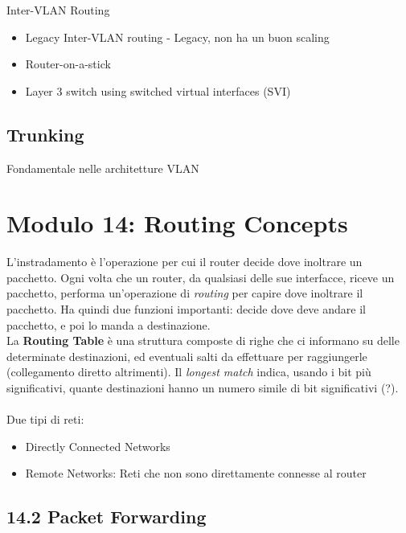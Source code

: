 \documentclass[12pt, a4paper]{article}
\begin{document}
	Inter-VLAN Routing
	\begin{itemize}
		\item Legacy Inter-VLAN routing - Legacy, non ha un buon scaling
		\item Router-on-a-stick 
		\item Layer 3 switch using switched virtual interfaces (SVI)
	\end{itemize}	
	
	\subsection*{Trunking}
	Fondamentale nelle architetture VLAN
	
	
	
	\section*{Modulo 14: Routing Concepts}
	
	L'instradamento è l'operazione per cui il router decide dove inoltrare un pacchetto. Ogni volta che un router, da qualsiasi delle sue interfacce, riceve un pacchetto, performa un'operazione di \textit{routing} per capire dove inoltrare il pacchetto. Ha quindi due funzioni importanti: decide dove deve andare il pacchetto, e poi lo manda a destinazione. \\
	La \textbf{Routing Table} è una struttura composte di righe che ci informano su delle determinate destinazioni, ed eventuali salti da effettuare per raggiungerle (collegamento diretto altrimenti). Il \textit{longest match} indica, usando i bit più significativi, quante destinazioni hanno un numero simile di bit significativi (?). \\\\
	Due tipi di reti:
	\begin{itemize}
		\item Directly Connected Networks
		\item Remote Networks: Reti che non sono direttamente connesse al router
	\end{itemize}
	
	
	\subsection*{14.2 Packet Forwarding}
	
\end{document}
